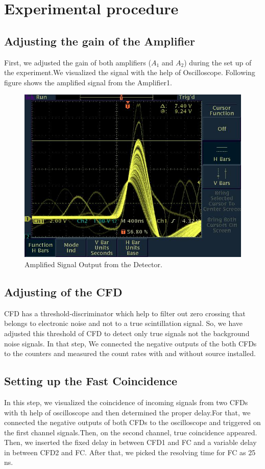 \section{Experimental procedure}
\subsection{Adjusting the gain of the Amplifier}
First, we adjusted the gain of both amplifiers  ($A_{1}$ and  $A_{2}$) during the set up of the experiment.We visualized the signal with the help of Oscilloscope. Following figure shows the amplified signal from the Amplifier1.
\begin{figure}[ht]
	\centering
	\includegraphics[width=0.8\linewidth]{./figs/amplified.jpg}
	\caption{Amplified Signal Output from the Detector.}%
	\label{fig:angAsymm}
\end{figure}

\subsection{Adjusting of the CFD}
CFD has a threshold-discriminator which help to filter out zero crossing that belongs to electronic noise and not to a true scintillation signal. So, we have adjusted this threshold of CFD to detect only true signals not the background noise signals. In that step, We connected the negative outputs of the both CFDs to the counters and measured the count rates with and without source installed.

\subsection{Setting up the Fast Coincidence}
In this step, we visualized the coincidence of incoming signals from two CFDs with th help of oscilloscope and then determined the proper delay.For that, we connected the negative outputs of both CFDs to the oscilloscope and triggered on the first channel signals.Then, on the second channel, true coincidence appeared. Then, we inserted the fixed delay in between CFD1 and FC and a variable delay in between CFD2 and FC. After that, we picked the resolving time for FC as 25 ns.

